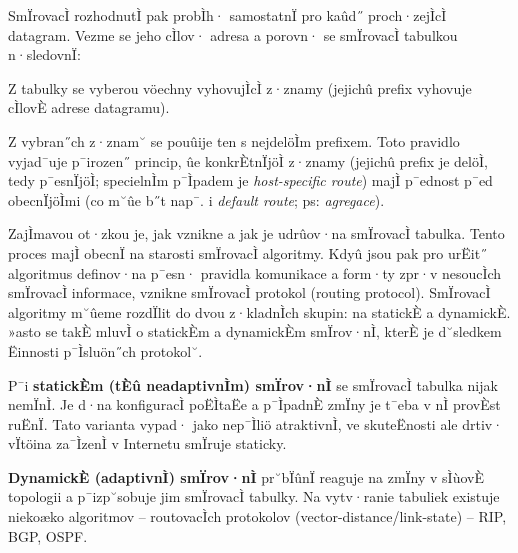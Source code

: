 SmÏrovacÌ rozhodnutÌ pak probÌh· samostatnÏ pro kaûd˝ proch·zejÌcÌ datagram. Vezme se jeho cÌlov· adresa a porovn· se smÏrovacÌ tabulkou n·sledovnÏ:
\begin{pitemize}
	\item Z tabulky se vyberou vöechny vyhovujÌcÌ z·znamy (jejichû prefix vyhovuje cÌlovÈ adrese datagramu).
	\item Z vybran˝ch z·znam˘ se pouûije ten s nejdelöÌm prefixem. Toto pravidlo vyjad¯uje p¯irozen˝ princip, ûe konkrÈtnÏjöÌ z·znamy (jejichû prefix je delöÌ, tedy p¯esnÏjöÌ; specielnÌm p¯Ìpadem je \emph{host-specific route}) majÌ p¯ednost p¯ed obecnÏjöÌmi (co m˘ûe b˝t nap¯. i \emph{default route}; ps: \emph{agregace}).
\end{pitemize}

ZajÌmavou ot·zkou je, jak vznikne a jak je udrûov·na smÏrovacÌ tabulka. Tento proces majÌ obecnÏ na starosti smÏrovacÌ algoritmy. Kdyû jsou pak pro urËit˝ algoritmus definov·na p¯esn· pravidla komunikace a form·ty zpr·v nesoucÌch smÏrovacÌ informace, vznikne smÏrovacÌ protokol (routing protocol). SmÏrovacÌ algoritmy m˘ûeme rozdÏlit do dvou z·kladnÌch skupin: na statickÈ a dynamickÈ. »asto se takÈ mluvÌ o statickÈm a dynamickÈm smÏrov·nÌ, kterÈ je d˘sledkem Ëinnosti p¯Ìsluön˝ch protokol˘.

P¯i \textbf{statickÈm (tÈû neadaptivnÌm) smÏrov·nÌ} se smÏrovacÌ tabulka nijak nemÏnÌ. Je d·na konfiguracÌ poËÌtaËe a p¯ÌpadnÈ zmÏny je t¯eba v nÌ provÈst ruËnÏ. Tato varianta vypad· jako nep¯Ìliö atraktivnÌ, ve skuteËnosti ale drtiv· vÏtöina za¯ÌzenÌ v Internetu smÏruje staticky.

\textbf{DynamickÈ (adaptivnÌ) smÏrov·nÌ} pr˘bÏûnÏ reaguje na zmÏny v sÌùovÈ topologii a p¯izp˘sobuje jim smÏrovacÌ tabulky. Na vytv·ranie tabuliek existuje niekoæko algoritmov -- routovacÌch protokolov (vector-distance/link-state) -- RIP, BGP, OSPF.

